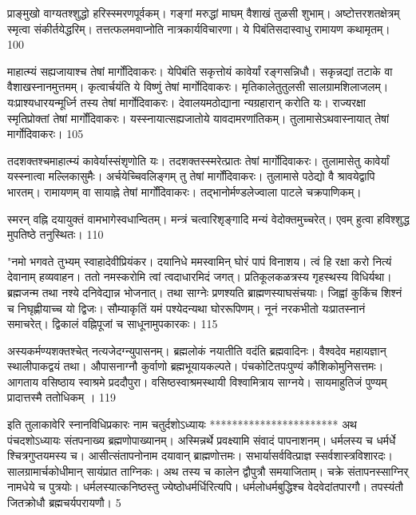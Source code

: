प्राङ्मुखो वाग्यतश्शुद्धो हरिस्स्मरणपूर्वकम्।
गङ्गां मरुद्धां माघम् वैशाखं तुळसी शुभाम्।
अष्टोत्तरशतक्षेत्रम् स्मृत्वा संकीर्तयेद्धरिम्।
तत्तत्फलमवाप्नोति नात्रकार्यविचारणा।
ये पिबंतिसदास्वाधु रामायण कथामृतम्।
100

माहात्म्यं सह्यजायाश्च तेषां मार्गोंदिवाकरः।
येपिबंति सकृत्तोयं कावेर्यां रङ्गसन्निधौ।
सकृन्नद्यां तटाके वा वैशाखस्नानमुत्तमम्।
कृत्वार्चयंति ये विष्णुं तेषां मार्गोदिवाकरः।
मृतिकालेतुतुलसी सालग्रामशिलाजलम्।
यःप्राश्यधारयन्मूर्ध्नि तस्य तेषां मार्गोदिवाकरः।
देवालयमठोद्याना न्यग्रहारान् करोति यः।
राज्यरक्षा स्मृतिप्रोक्तां तेषां मार्गोंदिवाकरः।
यस्स्नायात्सह्यजातोये यावदामरणांतिकम्।
तुलामासेऽथवास्नायात् तेषां मार्गोदिवाकरः।
105

तदशक्तश्चमाहात्म्यं कावेर्यास्संशृणोति यः।
तदशक्तस्स्मरेत्प्रातः तेषां मार्गोदिवाकरः।
तुलामासेतु कावेर्यां यस्स्नात्वा मल्लिकासुमैः।
अर्चयेच्चिवलिङ्गम् तु तेषां मार्गोंदिवाकरः।
तुलामासे पठेद्यो वै श्रावयेद्वापि भारतम्।
रामायणम् वा सायाह्ने तेषां मार्गोंदिवाकरः।
तद्भानोर्मण्डलेज्वाला पाटले चक्रपाणिकम्।

स्मरन् वह्नि दयायुक्तं वामभागेस्वधान्वितम्।
मन्त्रं चत्वारिशृङ्गादि मन्यं वेदोक्तमुच्चरेत्।
एवम् हुत्वा हविश्शुद्ध मुपतिष्ठे तनुस्थितः।
110

"नमो भगवते तुभ्यम् स्वाहादेवीप्रियंकर।
दयानिधे ममस्वामिन् घोरं पापं विनाशय।
त्वं हि रक्षा करो नित्यं देवानाम् हव्यवाहन।
ततो नमस्करोमि त्वां त्वदाधारमिदं जगत्।
प्रतिकूलकळत्रस्य गृहस्थस्य विधिर्यथा।
ब्रह्मजन्म तथा नश्ये दनिवेद्यान्न भोजनात्।
तथा साग्नेः प्रणश्यति ब्राह्मणस्याघसंचयाः।
जिह्वां कुकिंच शिश्नं च निघृह्णीयाच्च यो द्विजः।
सौम्याकृतिं यमं पश्येदन्यथा घोररूपिणम्।
नूनं नरकभीतो यःप्रातस्नानं समाचरेत्।
द्विकालं वह्निपूजां च साधूनामुपकारकः।
115

अस्यकर्मण्यशक्तश्चेत् नत्यजेदग्न्युपासनम्।
ब्रह्मलोकं नयातीति वदंति ब्रह्मवादिनः।
वैश्वदेव महायज्ञान् स्थालीपाकद्वयं तथा।
औपासनाग्नौ कुर्वाणो ब्रह्मभूयायकल्पते।
पंचकोटितपःपुण्यं कौशिकोमुनिसत्तमः।
आगताय वसिष्ठाय स्वाश्रमे प्रददौपुरा।
वसिष्ठस्वाश्रमस्थायी विश्वामित्राय साग्नये।
सायमाहुतिजं पुण्यम् प्रादात्तस्मै ततोधिकम् ।
119


इति तुलाकावेरि स्नानविधिप्रकारः नाम
चतुर्दशोऽध्यायः
***********************
अथ पंचदशोऽध्यायः
संतपनाख्य ब्रह्मणोपाख्यानम्।
अस्मिन्नर्थे प्रवक्ष्यामि संवादं पापनाशनम्।
धर्मलस्य च धर्मर्धे श्चित्रगुप्तयमस्य च।
आसीत्संतापनोनाम दयावान् ब्राह्मणोत्तमः।
सभार्यासर्ववित्प्राज्ञ स्सर्वशास्त्रविशारदः।
सालग्रामार्चकोधीमान् सायंप्रात ताग्निकः।
अथ तस्य च कालेन द्वौपुत्रौ समयाजिताम्।
चक्रे संतापनस्साग्निर् नामधेये च पुत्रयोः।
धर्मलस्यात्कनिष्ठस्तु ज्येष्ठोधर्मर्धिरित्यपि।
धर्मलोधर्मबुद्धिश्च वेदवेदांतपारगौ।
तपस्यंतौ जितक्रोधौ ब्रह्मचर्यपरायणौ।
5

